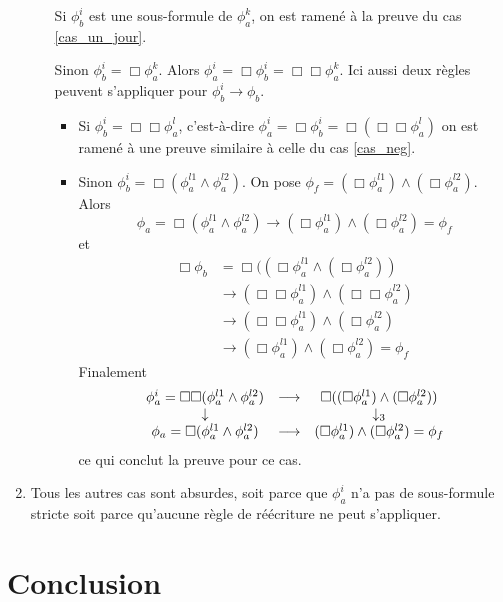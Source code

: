 \documentclass[12pt]{article}
\newcommand{\lra}{\ensuremath{\longrightarrow}}
\begin{document}
\begin{enumerate}
\begin{itemize}
    Si \(\phi_b^i\) est une sous-formule de \(\phi_a^k\), on est ramené à la preuve du cas \ref{cas_un_jour}.

    Sinon \(\phi_b^i = \Box \phi_a^k\).
    Alors \(\phi_a^i = \Box \phi_b^i = \Box \Box \phi_a^k\).
    Ici aussi deux règles peuvent s'appliquer pour \(\phi_b^i \lra \phi_b\).
    \begin{itemize}
    \item Si \(\phi_b^i = \Box \Box \phi_a^l\), c'est-à-dire \(\phi_a^i = \Box \phi_b^i = \Box (\Box \Box \phi_a^l)\) on est ramené à une preuve similaire à celle du cas \ref{cas_neg}.
    \item Sinon \(\phi_b^i = \Box (\phi_a^{l1} \land \phi_a^{l2})\).
      On pose \(\phi_f = (\Box \phi_a^{l1}) \land (\Box \phi_a^{l2})\).
      Alors
      \[ \phi_a = \Box (\phi_a^{l1} \land \phi_a^{l2}) \lra (\Box \phi_a^{l1}) \land (\Box \phi_a^{l2}) = \phi_f \]
      et
      \begin{align*}
        \Box \phi_b & = \Box ((\Box \phi_a^{l1} \land (\Box \phi_a^{l2})) \\
                    & \lra (\Box \Box \phi_a^{l1}) \land (\Box \Box \phi_a^{l2}) \\
                    & \lra (\Box \Box \phi_a^{l1}) \land (\Box \phi_a^{l2}) \\
                    & \lra (\Box \phi_a^{l1}) \land (\Box \phi_a^{l2}) = \phi_f
      \end{align*}
      Finalement
      \[\begin{array}{c c c}
          \phi_a^i = \Box \Box (\phi_a^{l1} \land \phi_a^{l2}) & \lra & \Box ((\Box \phi_a^{l1}) \land (\Box \phi_a^{l2})) \\
          \downarrow & & \downarrow_3 \\
          \phi_a = \Box (\phi_a^{l1} \land \phi_a^{l2}) & \lra & (\Box \phi_a^{l1}) \land (\Box \phi_a^{l2}) = \phi_f
        \end{array}\]
      ce qui conclut la preuve pour ce cas.
    \end{itemize}
  \end{itemize}
\item
  Tous les autres cas sont absurdes, soit parce que \(\phi_a^i\) n'a pas de sous-formule stricte soit parce qu'aucune règle de réécriture ne peut s'appliquer.
\end{enumerate}


\section{Conclusion}
\end{document}
